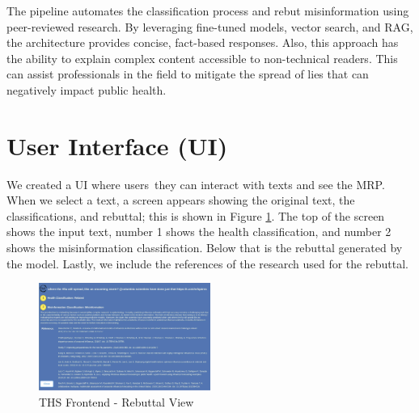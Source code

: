 The pipeline automates the classification process and rebut misinformation using peer-reviewed research. By leveraging fine-tuned models, vector search, and RAG, the architecture provides concise, fact-based responses. Also, this
approach has the ability to explain complex content accessible to non-technical readers. This can assist professionals in the field to mitigate the spread of lies that can negatively impact public health.


\section{User Interface (UI)}
We created a UI where users they can interact with texts and see the MRP. When we select a text, a screen appears showing the original text, the classifications, and rebuttal; this is shown in Figure \ref{fig:frontendrebuttal}. The top of the screen shows the input text, number 1 shows the health classification, and number 2 shows the misinformation classification. Below that is the rebuttal generated by the model. Lastly, we include the references of the research used for the rebuttal. 
\begin{figure}[H]
	\begin{center}
		\includegraphics[width=0.5\textwidth]{figures/THS_Rebuttal_view.jpeg} %
	\end{center}
	\caption{THS Frontend  - Rebuttal View} %
	\label{fig:frontendrebuttal}
\end{figure}






